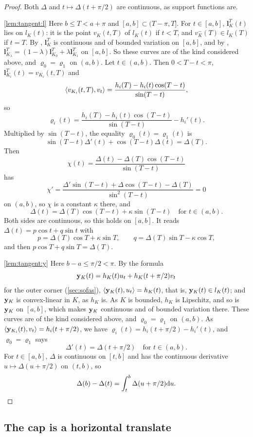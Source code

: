 \begin{proof}
Both $\Delta$ and $t\mapsto\Delta(t+\pi/2)$ are continuous, as support functions
are.

\ref{lem:tangent:l} Here $b\le T<a+\pi$ and $[a,b]\subset(T-\pi,T]$. For
$t\in[a,b]$, $\mathbf l_K^T(t)$ lies on $l_K(t)$: it is the point $v_K(t,T)$ of
$l_K(t)$ if $t<T$, and $v_K^-(T)\in l_K(T)$ if $t=T$. By ,
$\mathbf l_K^T$ is continuous and of bounded variation on $[a,b]$, and by
, $\mathbf l_{K_\lambda}^T=(1-\lambda)\mathbf
l_{K_0}^T+\lambda\mathbf l_{K_1}^T$ on $[a,b]$. So these curves are of the kind
considered above, and $\varrho_0=\varrho_1$ on $(a,b)$. Let $t\in(a,b)$. Then
$0<T-t<\pi$, $\mathbf l_{K_i}^T(t)=v_{K_i}(t,T)$ and
\[
  \langle v_{K_i}(t,T),v_t\rangle=\frac{h_i(T)-h_i(t)\cos(T-t)}{\sin(T-t)},
\]
so
\[
  \varrho_i(t)=\frac{h_i(T)-h_i(t)\cos(T-t)}{\sin(T-t)}-h_i'(t).
\]
Multiplied by $\sin(T-t)$, the equality $\varrho_0(t)=\varrho_1(t)$ is
\[
  \sin(T-t)\Delta'(t)+\cos(T-t)\Delta(t)=\Delta(T).
\]
Then
\[
  \chi(t)=\frac{\Delta(t)-\Delta(T)\cos(T-t)}{\sin(T-t)}
\]
has
\[
  \chi'=\frac{\Delta'\sin(T-t)+\Delta\cos(T-t)-\Delta(T)}{\sin^2(T-t)}=0
\]
on $(a,b)$, so $\chi$ is a constant $\kappa$ there, and
\[
  \Delta(t)=\Delta(T)\cos(T-t)+\kappa\sin(T-t)\quad\text{for }t\in(a,b).
\]
Both sides are continuous, so this holds on $[a,b]$. It reads
$\Delta(t)=p\cos t+q\sin t$ with
\[
  p=\Delta(T)\cos T+\kappa\sin T,\qquad q=\Delta(T)\sin T-\kappa\cos T,
\]
and then $p\cos T+q\sin T=\Delta(T)$.

\ref{lem:tangent:y} Here $b-a\le\pi/2<\pi$. By the formula
\[
  \mathbf{y}_K(t)=h_K(t)u_t+h_K(t+\pi/2)v_t
\]
for the outer corner (\cref{sec:sofas}), $\langle \mathbf{y}_K(t),u_t\rangle=h_K(t)$, that is,
$\mathbf{y}_K(t)\in l_K(t)$; and $\mathbf{y}_K$ is convex-linear in $K$, as $h_K$ is. As $K$
is bounded, $h_K$ is Lipschitz, and so is $\mathbf{y}_K$ on $[a,b]$, which makes
$\mathbf{y}_K$ continuous and of bounded variation there. These curves are of the kind
considered above, and $\varrho_0=\varrho_1$ on $(a,b)$. As
$\langle \mathbf{y}_{K_i}(t),v_t\rangle=h_i(t+\pi/2)$, we have
$\varrho_i(t)=h_i(t+\pi/2)-h_i'(t)$, and $\varrho_0=\varrho_1$ says
\[
  \Delta'(t)=\Delta(t+\pi/2)\quad\text{for }t\in(a,b).
\]
For $t\in[a,b]$, $\Delta$ is continuous on $[t,b]$ and has the continuous
derivative $u\mapsto\Delta(u+\pi/2)$ on $(t,b)$, so
\[
  \Delta(b)-\Delta(t)=\int_t^b\Delta(u+\pi/2)\mathrm{d} u.\qedhere
\]
\end{proof}

\subsection{The cap is a horizontal translate}

